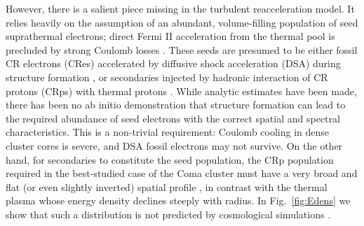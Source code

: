 \documentclass[useAMS,usenatbib]{mn2e}
\begin{document}
However, there is a salient piece missing in the turbulent
reacceleration model. It relies heavily on the assumption of an
abundant, volume-filling population of seed suprathermal electrons;
direct Fermi II acceleration from the thermal pool is precluded by
strong Coulomb losses
\citep{2008ApJ...682..175P,2012ApJ...759..113C}. These seeds are
presumed to be either fossil CR electrons (CRes) accelerated by
diffusive shock acceleration (DSA) during structure formation
\citep{1999ApJ...520..529S}, or secondaries injected by hadronic
interaction of CR protons (CRps) with thermal protons
\citep{brunetti11}. While analytic estimates have been made, there has
been no ab initio demonstration that structure formation can lead to
the required abundance of seed electrons with the correct spatial and
spectral characteristics. This is a non-trivial requirement: Coulomb
cooling in dense cluster cores is severe, and DSA fossil electrons may
not survive. On the other hand, for secondaries to constitute the seed
population, the CRp population required in the best-studied case of
the Coma cluster must have a very broad and flat (or even slightly
inverted) spatial profile \citep{brunetti12}, in contrast with the
thermal plasma whose energy density declines steeply with radius. In
Fig.~\ref{fig:Edens} we show that such a distribution is not predicted by
cosmological simulations \cite[see
  also][]{pinzke10,2014MNRAS.439.2662V}.
\end{document}
